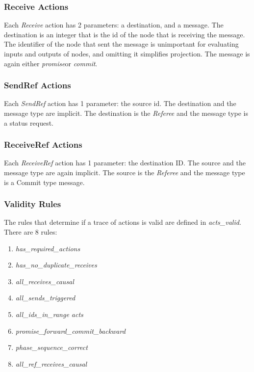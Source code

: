 \documentclass[runningheads]{llncs}
\newcommand{\promise}{\emph{promise}}
\newcommand{\commit}{\emph{commit}}
\begin{document}
\subsubsection{Receive Actions}
Each \emph{Receive} action has 2 parameters: a destination, and a message. The destination is an integer that is the id of the node that is receiving the message. The identifier of the node that sent the message is unimportant for evaluating inputs and outputs of nodes, and omitting it simplifies projection. The message is again either \promise or \commit.

\subsubsection{SendRef Actions}
Each \emph{SendRef} action has 1 parameter: the source id. The destination and the message type are implicit. The destination is the \emph{Referee} and the message type is a status request. 

\subsubsection{ReceiveRef Actions}
Each \emph{ReceiveRef} action has 1 parameter: the destination ID. The source and the message type are again implicit. The source is the \emph{Referee} and the message type is a Commit type message.

\subsubsection{Validity Rules} \label{sec:validity_rules}
The rules that determine if a trace of actions is valid are defined in \emph{acts\_valid}. There are 8 rules:

\begin{enumerate}
  \itemsep 0pt
  \item \emph{has\_required\_actions}
  \item \emph{has\_no\_duplicate\_receives}
  \item \emph{all\_receives\_causal}
  \item \emph{all\_sends\_triggered}
  \item \emph{all\_ids\_in\_range acts}
  \item \emph{promise\_forward\_commit\_backward}
  \item \emph{phase\_sequence\_correct}
  \item \emph{all\_ref\_receives\_causal}
\end{enumerate}
\end{document}
